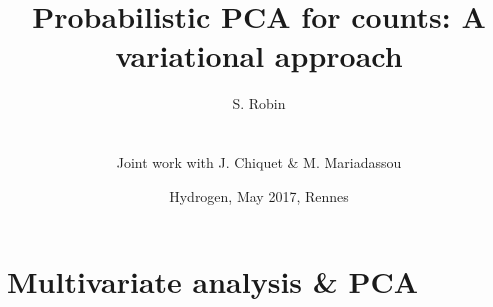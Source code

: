 \documentclass[10pt]{beamer}
\newcommand{\fignet}{/home/robin/Bureau/RECHERCHE/RESEAUX/EXPOSES/FIGURES}
\begin{document}

\title[Probabilistic PCA for counts]{Probabilistic PCA for counts: A variational approach}

\author[S. Robin]{S. Robin \\ ~\\
  \begin{tabular}{ll}
    Joint work with J. Chiquet \& M. Mariadassou
  \end{tabular}
  }


\date[May 2017, Rennes]{Hydrogen, May 2017, Rennes}

\maketitle

\section{Multivariate analysis \& PCA}
\frame{\tableofcontents[currentsection]}

\end{document}
